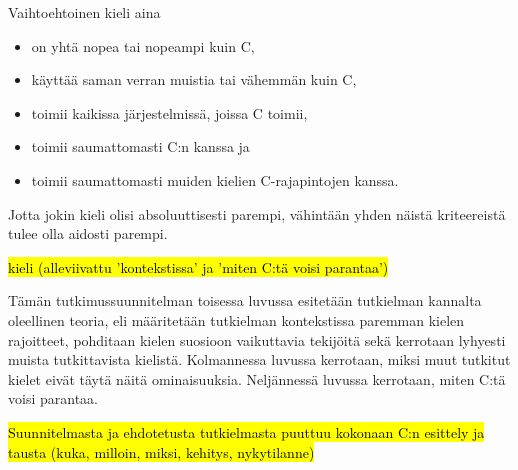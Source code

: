 Vaihtoehtoinen kieli aina
\begin{itemize}[topsep=0pt,itemsep=0pt]
    \item on yhtä nopea tai nopeampi kuin C,
    \item käyttää saman verran muistia tai vähemmän kuin C,
    \item toimii kaikissa järjestelmissä, joissa C toimii,
    \item toimii saumattomasti C:n kanssa ja
    \item toimii saumattomasti muiden kielien C-rajapintojen kanssa.
\end{itemize}
Jotta jokin kieli olisi absoluuttisesti parempi, vähintään yhden näistä
kriteereistä tulee olla aidosti parempi.


\hl{kieli (alleviivattu 'kontekstissa' ja 'miten C:tä voisi parantaa')}

Tämän tutkimussuunnitelman toisessa luvussa esitetään tutkielman kannalta
oleellinen teoria, eli määritetään tutkielman kontekstissa paremman kielen
rajoitteet, pohditaan kielen suosioon vaikuttavia tekijöitä sekä kerrotaan
lyhyesti muista tutkittavista kielistä. Kolmannessa luvussa kerrotaan, miksi
muut tutkitut kielet eivät täytä näitä ominaisuuksia. Neljännessä luvussa
kerrotaan, miten C:tä voisi parantaa.

\hl{Suunnitelmasta ja ehdotetusta tutkielmasta puuttuu kokonaan C:n esittely ja tausta (kuka, milloin, miksi, kehitys, nykytilanne)}

